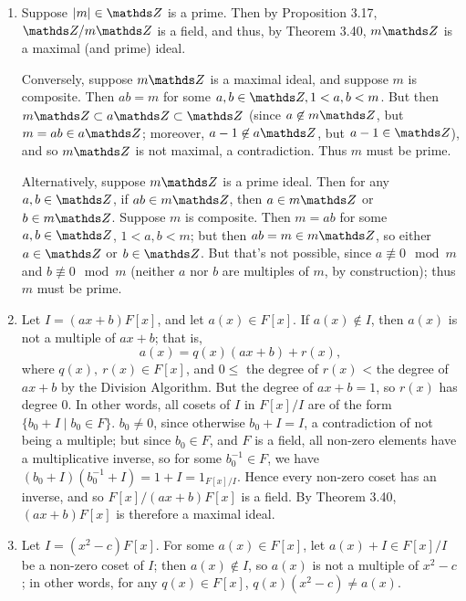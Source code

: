 \documentclass{homework}
\begin{document}
\begin{solution}
  \begin{enumerate}[label=(\alph*)]
    \item Suppose $\left| m \right| \in \Z$ is a prime. Then by Proposition 3.17, $\Z / m\Z$ is a
      field, and thus, by Theorem 3.40, $m\Z$ is a maximal (and prime) ideal.
      
      Conversely, suppose $m\Z$ is a maximal ideal, and suppose $m$ is composite. Then $ab=m$ for some
      $a,b\in \Z, 1<a,b<m$. But then $m\Z \subset a\Z \subset \Z$ (since $a\not\in m\Z$, but
      $m=ab\in a\Z$; moreover, $a-1\not\in a\Z$, but $a-1\in \Z$), and so $m\Z$ is not maximal, a
      contradiction. Thus $m$ must be prime.

      Alternatively, suppose $m\Z$ is a prime ideal. Then for any $a,b\in \Z$, if $ab\in m\Z$, then
      $a\in m\Z$ or $b\in m\Z$. Suppose $m$ is composite. Then $m=ab$ for some $a,b\in \Z$,
      $1<a,b<m$; but then $ab=m\in m\Z$, so either $a\in \Z$ or $b\in \Z$. But that's not possible,
      since $a\not\equiv 0\mod{m}$ and $b\not\equiv 0\mod{m}$ (neither $a$ nor $b$ are multiples of
      $m$, by construction); thus $m$ must be prime.

    \item Let $I=(ax+b)F[x]$, and let $a(x)\in F[x]$. If $a(x)\not\in I$, then $a(x)$ is not a
      multiple of $ax+b$; that is, \[
        a(x)=q(x)(ax+b)+r(x)
      ,\] where $q(x),\ r(x)\in F[x]$, and $0\le $ the degree of $r(x)$ < the degree of $ax+b$ by
      the Division Algorithm. But the degree of $ax+b=1$, so $r(x)$ has degree $0$. In other words,
      all cosets of $I$ in $F[x] / I$ are of the form $\{b_0+I\mid b_0\in F \} $. $b_0\neq 0$, since
      otherwise $b_0+I=I$, a contradiction of not being a multiple; but since $b_0\in F$, and $F$ is
      a field, all non-zero elements have a multiplicative inverse, so for some $b_0^{-1}\in F$, we
      have $(b_0+I)(b_0^{-1}+I)=1+I=1_{F[x] / I}$. Hence every non-zero coset has an inverse, and so
      $F[x] / (ax+b)F[x]$ is a field. By Theorem 3.40, $(ax+b)F[x]$ is therefore a maximal ideal.

    \item Let $I=(x^2-c)F[x]$. For some $a(x)\in F[x]$, let $a(x)+I\in F[x] / I$ be a non-zero coset
      of $I$; then $a(x)\not\in I$, so $a(x)$ is not a multiple of $x^2-c$; in other words, for any
      $q(x)\in F[x]$, $q(x)(x^2-c)\neq a(x)$.


\end{enumerate}
\end{solution}
\end{document}
